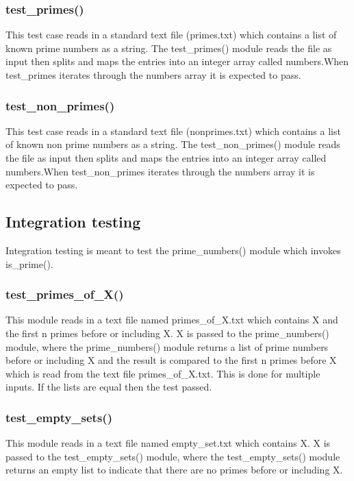 \documentclass{article}
\begin{document}
\subsubsection{test\_primes()}  
This test case reads in a standard text file (primes.txt) which contains a list of known prime numbers as a string. The test\_primes() module reads the file as input then splits and maps the entries into an integer array called numbers.When test\_primes iterates through the numbers array it is expected to pass.

 \subsubsection{test\_non\_primes()}
This test case reads in a standard text file (nonprimes.txt) which contains a list of known non prime numbers as a string. The test\_non\_primes() module reads the file as input then splits and maps the entries into an integer array called numbers.When test\_non\_primes iterates through the numbers array it is expected to pass.

\subsection{Integration testing} 
\large{Integration testing is meant to test the prime\_numbers()
module which invokes is\_prime().}

\subsubsection{test\_primes\_of\_X()} 
This module reads in a text file named primes\_of\_X.txt which contains X and the first n primes before or including X. X is passed to the prime\_numbers() module, where the prime\_numbers() module returns a list of prime numbers before or including X and the result is compared to the first n primes before X which is read from the text file  primes\_of\_X.txt. This is done for multiple inputs. If the lists are equal then the test passed.

\subsubsection{test\_empty\_sets()}
This module reads in a text file named empty\_set.txt which contains X. X is passed to the test\_empty\_sets() module, where the test\_empty\_sets() module returns an empty list to indicate that there are no primes before or including X.
\end{document}
